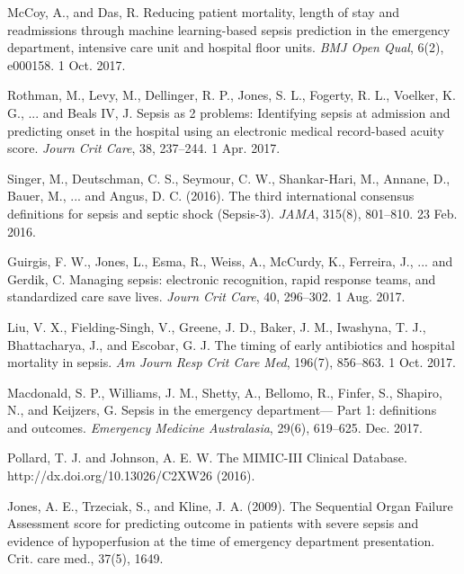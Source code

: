 \documentclass{amia}
\begin{document}
\begin{thebibliography}{1}
        McCoy, A., and Das, R. Reducing patient mortality, length of stay and readmissions through machine 
        learning-based sepsis prediction in the emergency department, intensive care unit and hospital 
        floor units. {\it BMJ Open Qual}, 6(2), e000158. 1 Oct. 2017.

        Rothman, M., Levy, M., Dellinger, R. P., Jones, S. L., Fogerty, R. L., Voelker, K. G., ... and Beals IV, J. 
        Sepsis as 2 problems: Identifying sepsis at admission and predicting onset in the hospital using an electronic 
        medical record-based acuity score. {\it Journ Crit Care}, 38, 237--244. 1 Apr. 2017.


        Singer, M., Deutschman, C. S., Seymour, C. W., Shankar-Hari, M., Annane, D., Bauer, M., ... and
        Angus, D. C. (2016). The third international consensus definitions for sepsis and septic shock (Sepsis-3). 
        {\it JAMA}, 315(8), 801--810. 23 Feb. 2016.

        Guirgis, F. W., Jones, L., Esma, R., Weiss, A., McCurdy, K., Ferreira, J., ... and Gerdik, C. 
        Managing sepsis: electronic recognition, rapid response teams, and standardized care save lives. 
        {\it Journ Crit Care}, 40, 296--302. 1 Aug. 2017.

        Liu, V. X., Fielding-Singh, V., Greene, J. D., Baker, J. M., Iwashyna, T. J., Bhattacharya, J., and 
        Escobar, G. J. The timing of early antibiotics and hospital mortality in sepsis. 
        {\it Am Journ Resp Crit Care Med}, 196(7), 856--863. 1 Oct. 2017.

        Macdonald, S. P., Williams, J. M., Shetty, A., Bellomo, R., Finfer, S., Shapiro, N., and Keijzers, G. 
        Sepsis in the emergency department--- Part 1: definitions and outcomes. 
        {\it Emergency Medicine Australasia}, 29(6), 619--625. Dec. 2017.

        Pollard, T. J. and Johnson, A. E. W. 
        The MIMIC-III Clinical Database. http://dx.doi.org/10.13026/C2XW26 (2016).

        Jones, A. E., Trzeciak, S., and Kline, J. A. (2009). 
        The Sequential Organ Failure Assessment score for predicting outcome in patients with 
        severe sepsis and evidence of hypoperfusion at the time of emergency department presentation. 
        Crit. care med., 37(5), 1649.


\end{thebibliography}
\end{document}
